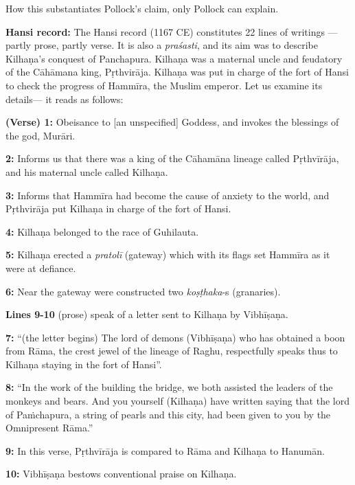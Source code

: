 How this substantiates Pollock’s claim, only Pollock can explain. 

\smallskip
\noindent
{\bf Hansi record:} The Hansi record (1167 CE) constitutes 22 lines of writings — partly prose, partly verse. It is also a {\sl praśasti}, and its aim was to describe Kilhaṇa’s conquest of Panchapura. Kilhaṇa was a maternal uncle and feudatory of the Cāhāmana king, Pṛthvirāja. Kilhaṇa was put in charge of the fort of Hansi to check the progress of Hammīra, the Muslim emperor. Let us examine its details— it reads as follows:



\noindent
{\bf (Verse) 1:} Obeisance to [an unspecified] Goddess, and invokes the blessings of the god, Murāri.

\smallskip
\noindent
{\bf 2:} Informs us that there was a king of the Cāhamāna lineage called Pṛthvīrāja, and his maternal uncle called Kilhaṇa. 

\smallskip
\noindent
{\bf 3:} Informs that Hammīra had become the cause of anxiety to the world, and Pṛthvirāja put Kilhaṇa in charge of the fort of Hansi. 

\smallskip
\noindent
{\bf 4:} Kilhaṇa belonged to the race of Guhilauta. 

\smallskip
\noindent
{\bf 5:} Kilhaṇa erected a {\sl pratolī} (gateway) which with its flags set Hammīra as it were at defiance. 

\smallskip
\noindent
{\bf 6:} Near the gateway were constructed two {\sl koṣṭhaka}-s (granaries).

\smallskip
\noindent
{\bf Lines 9-10} (prose) speak of a letter sent to Kilhaṇa by Vibhīṣaṇa.

\smallskip
\noindent
{\bf 7:} “(the letter begins) The lord of demons (Vibhīṣaṇa) who has obtained a boon from Rāma, the crest jewel of the lineage of Raghu, respectfully speaks thus to Kilhaṇa staying in the fort of Hansi”.  

\smallskip
\noindent
{\bf 8:} “In the work of the building the bridge, we both assisted the leaders of the monkeys and bears. And you yourself (Kilhaṇa) have written saying that the lord of Paṁchapura, a string of pearls and this city, had been given to you by the Omnipresent Rāma.”

\smallskip
\noindent
{\bf 9:} In this verse, Pṛthvīrāja is compared to Rāma and Kilhaṇa to Hanumān. 

\smallskip
\noindent
{\bf 10:} Vibhīṣaṇa bestows conventional praise on Kilhaṇa. 

